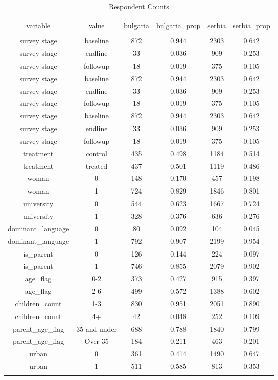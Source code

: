 
\begin{table}[!htbp] \centering 
  \caption{Respondent Counts} 
  \label{tbl:Respondent Counts} 
\begin{tabular}{@{\extracolsep{5pt}} cccccc} 
\\[-1.8ex]\hline 
\hline \\[-1.8ex] 
variable & value & bulgaria & bulgaria\_prop & serbia & serbia\_prop \\ 
\hline \\[-1.8ex] 
survey stage & baseline & 872 & 0.944 & 2303 & 0.642 \\ 
survey stage & endline &  33 & 0.036 &  909 & 0.253 \\ 
survey stage & followup &  18 & 0.019 &  375 & 0.105 \\ 
survey stage & baseline & 872 & 0.944 & 2303 & 0.642 \\ 
survey stage & endline &  33 & 0.036 &  909 & 0.253 \\ 
survey stage & followup &  18 & 0.019 &  375 & 0.105 \\ 
survey stage & baseline & 872 & 0.944 & 2303 & 0.642 \\ 
survey stage & endline &  33 & 0.036 &  909 & 0.253 \\ 
survey stage & followup &  18 & 0.019 &  375 & 0.105 \\ 
treatment & control & 435 & 0.498 & 1184 & 0.514 \\ 
treatment & treated & 437 & 0.501 & 1119 & 0.486 \\ 
woman & 0 & 148 & 0.170 &  457 & 0.198 \\ 
woman & 1 & 724 & 0.829 & 1846 & 0.801 \\ 
university & 0 & 544 & 0.623 & 1667 & 0.724 \\ 
university & 1 & 328 & 0.376 &  636 & 0.276 \\ 
dominant\_language & 0 &  80 & 0.092 &  104 & 0.045 \\ 
dominant\_language & 1 & 792 & 0.907 & 2199 & 0.954 \\ 
is\_parent & 0 & 126 & 0.144 &  224 & 0.097 \\ 
is\_parent & 1 & 746 & 0.855 & 2079 & 0.902 \\ 
age\_flag & 0-2 & 373 & 0.427 &  915 & 0.397 \\ 
age\_flag & 2-6 & 499 & 0.572 & 1388 & 0.602 \\ 
children\_count & 1-3 & 830 & 0.951 & 2051 & 0.890 \\ 
children\_count & 4+ &  42 & 0.048 &  252 & 0.109 \\ 
parent\_age\_flag & 35 and under & 688 & 0.788 & 1840 & 0.799 \\ 
parent\_age\_flag & Over 35 & 184 & 0.211 &  463 & 0.201 \\ 
urban & 0 & 361 & 0.414 & 1490 & 0.647 \\ 
urban & 1 & 511 & 0.585 &  813 & 0.353 \\ 
\hline \\[-1.8ex] 
\end{tabular} 
\end{table} 
